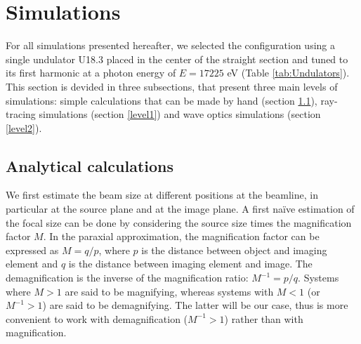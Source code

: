 \documentclass{iucr}              %
\begin{document}
\section{Simulations}

For all simulations presented hereafter, we selected the configuration using a single undulator U18.3 placed in the center of the straight section and tuned to its first harmonic at a photon energy of $E=17225$ eV (Table \ref{tab:Undulators}). This section is devided in three subsections, that present three main levels of simulations: simple calculations that can be made by hand (section \ref{level0}), ray-tracing simulations (section \ref{level1}) and wave optics simulations (section \ref{level2}).   

\subsection{Analytical calculations}
\label{level0}

We first estimate the beam size at different positions at the beamline, in particular at the source plane and at the image plane. A first na{\"{i}}ve estimation of the focal size can be done by considering the source size times the magnification factor $M$. In the paraxial approximation, the magnification factor can be expressed as $M=q/p$, where $p$ is the distance between object and imaging element and $q$ is the distance between imaging element and image. The demagnification is the inverse of the magnification ratio: $M^{-1}=p/q$. Systems where $M>1$ are said to be magnifying, whereas systems with $M<1$ (or $M^{-1}>1$) are said to be demagnifying. The latter will be our case, thus is more convenient to work with demagnification ($M^{-1}>1$) rather than with magnification. 
\end{document}
